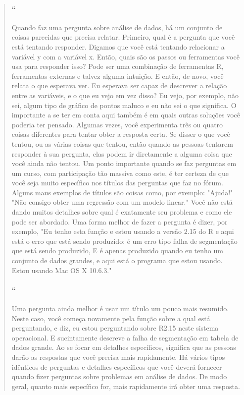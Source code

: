 \begin{quotation}
\begin{small}
\paragraph{``}
Quando faz uma pergunta sobre análise de dados,  há um conjunto de coisas parecidas que precisa relatar. Primeiro, qual é a pergunta que você está tentando responder. Digamos que você está tentando relacionar a variável y com a variável x. Então, quais são os passos ou ferramentas você usa para responder isso? Pode ser uma combinação de ferramentas R, ferramentas externas e talvez alguma intuição. E então, de novo, você relata o que esperava ver. Eu esperava ser capaz de descrever  a relação entre as variáveis, e o que eu vejo em vez disso? Eu vejo, por exemplo, não sei, algum tipo de gráfico de pontos maluco e eu não sei o que significa. O importante a se ter em conta aqui também é em quais outras soluções você poderia ter pensado. Algumas vezes, você experimenta três ou quatro coisas diferentes para tentar obter a resposta certa. Se disser o que você tentou, ou as várias coisas que tentou,  então quando as pessoas tentarem responder à sua pergunta,  elas podem ir diretamente a alguma coisa que você ainda não tentou. Um ponto importante quando se faz perguntas em um curso, com participação tão massiva como este,  é ter certeza de que você seja muito específico nos títulos  das perguntas que faz no fórum. Alguns maus exemplos de títulos são coisas como, por exemplo: "Ajuda!" "Não consigo obter uma regressão com um modelo linear." Você não está dando muitos detalhes sobre qual é exatamente seu problema e como ele pode ser abordado. Uma forma melhor de fazer a pergunta é dizer, por exemplo, "Eu tenho esta função e estou usando a versão 2.15 do R e aqui está o erro que está sendo produzido: é um erro tipo falha de segmentação que está sendo produzido, E é apenas produzido quando eu tenho um conjunto de dados grandes, e aqui está o programa que estou usando. Estou usando Mac OS X 10.6.3."

\paragraph{``}
Uma pergunta ainda melhor é usar um título um pouco mais resumido. Neste caso, você começa novamente pela função sobre a qual está perguntando,  e diz, eu estou perguntando sobre R2.15 neste sistema operacional. E sucintamente descreve a falha de segmentação em tabela de dados grande.  Ao se focar em detalhes específicos, significa que as pessoas darão as respostas que você precisa mais rapidamente. Há vários tipos idênticos de perguntas e detalhes específicos  que você deverá fornecer quando fizer perguntas sobre problemas em análise de dados. De modo geral, quanto mais específico for, mais rapidamente irá obter uma resposta.


\end{small}
\end{quotation}

